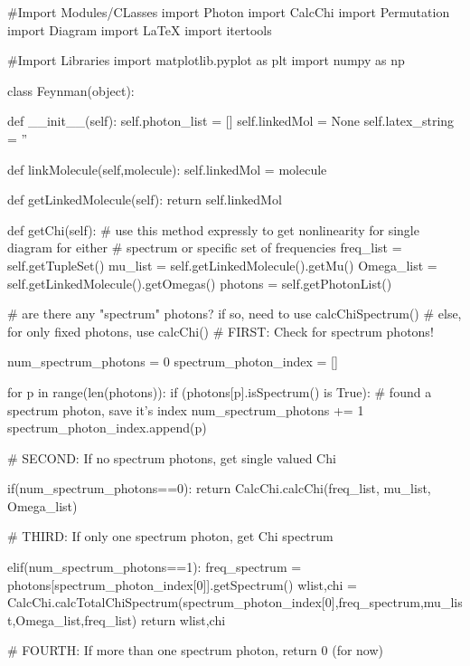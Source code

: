 \documentclass[11pt,a4paper,notitlepage]{article}
\begin{document}
\begin{code}
#Import Modules/CLasses
import Photon
import CalcChi
import Permutation
import Diagram
import LaTeX
import itertools

#Import Libraries
import matplotlib.pyplot as plt
import numpy as np

class Feynman(object):
    
    def __init__(self):
        self.photon_list = []
        self.linkedMol = None
        self.latex_string = ''
    
    def linkMolecule(self,molecule):
        self.linkedMol = molecule
    
    def getLinkedMolecule(self):
        return self.linkedMol

    def getChi(self):
        # use this method expressly to get nonlinearity for single diagram for either
        # spectrum or specific set of frequencies
        freq_list  = self.getTupleSet()
        mu_list    = self.getLinkedMolecule().getMu()
        Omega_list = self.getLinkedMolecule().getOmegas()
        photons = self.getPhotonList()
        
        # are there any "spectrum" photons? if so, need to use calcChiSpectrum()
        # else, for only fixed photons, use calcChi()
        # FIRST: Check for spectrum photons!
        
        num_spectrum_photons = 0
        spectrum_photon_index = []
        
        for p in range(len(photons)):
            if (photons[p].isSpectrum() is True):
                # found a spectrum photon, save it's index
                num_spectrum_photons += 1
                spectrum_photon_index.append(p)
        
        
        # SECOND: If no spectrum photons, get single valued Chi
        
        if(num_spectrum_photons==0):
            return CalcChi.calcChi(freq_list, mu_list, Omega_list)
        
        # THIRD: If only one spectrum photon, get Chi spectrum
        
        elif(num_spectrum_photons==1):
            freq_spectrum = photons[spectrum_photon_index[0]].getSpectrum()
            wlist,chi = CalcChi.calcTotalChiSpectrum(spectrum_photon_index[0],freq_spectrum,mu_list,Omega_list,freq_list)
            return wlist,chi
        
        # FOURTH: If more than one spectrum photon, return 0 (for now)
        

\end{code}
\end{document}
